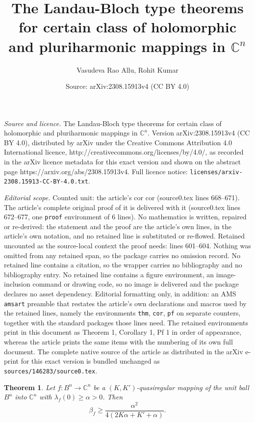 \documentclass[10pt,a4paper]{amsart}
\title{The Landau-Bloch type theorems for certain class of holomorphic and pluriharmonic mappings in $\mathbb{C}^n$}
\author{Vasudeva Rao Allu, Rohit Kumar}
\date{Source: arXiv:2308.15913v4 (CC BY 4.0)}
\newtheorem{thm}{Theorem}
\newcommand{\IC}{{\mathbb C}}
\begin{document}
\maketitle

\noindent\emph{Source and licence.} The Landau-Bloch type theorems for certain class of holomorphic and pluriharmonic mappings in $\mathbb{C}^n$. Version arXiv:2308.15913v4 (CC BY 4.0), distributed by arXiv under the Creative Commons Attribution 4.0 International licence, http://creativecommons.org/licenses/by/4.0/, as recorded in the arXiv licence metadata for this exact version and shown on the abstract page https://arxiv.org/abs/2308.15913v4. Full licence notice: \texttt{licenses/arxiv-2308.15913-CC-BY-4.0.txt}.\par\smallskip

\noindent\textit{Editorial scope.} Counted unit: the article's cor cor (source0.tex lines 668--671). The article's complete original proof of it is delivered with it (source0.tex lines 672--677, one \texttt{proof} environment of 6 lines). No mathematics is written, repaired or re-derived: the statement and the proof are the article's own lines, in the article's own notation, and no retained line is substituted or re-flowed.  Retained uncounted as the source-local context the proof needs: lines 601--604.  Nothing was omitted from any retained span, so the package carries no omission record.  No retained line contains a citation, so the wrapper carries no bibliography and no bibliography entry.  No retained line contains a figure environment, an image-inclusion command or drawing code, so no image is delivered and the package declares no asset dependency.  Editorial formatting only, in addition: an AMS \texttt{amsart} preamble that restates the article's own declarations and macros used by the retained lines, namely the environments \texttt{thm}, \texttt{cor}, \texttt{pf} on separate counters, together with the standard packages those lines need.  The retained environments print in this document as Theorem 1, Corollary 1, Pf 1 in order of appearance, whereas the article prints the same items with the numbering of its own full document.  The complete native source of the article as distributed in the arXiv e-print for this exact version is bundled unchanged as \texttt{sources/146283/source0.tex}.
\begin{thm}\label{Rohi-Vasu-P2-Theorem-002}
Let $f:B^n\to \IC^n$ be a $(K,K')$-quasiregular mapping of the unit ball $B^n$ into $\IC^n$ with $\lambda_f(0)\geq \alpha>0$. Then
$$\beta_f\geq \frac{\alpha^2}{4(2K\alpha+K'+\alpha)}.$$ 
\end{thm}
\end{document}
